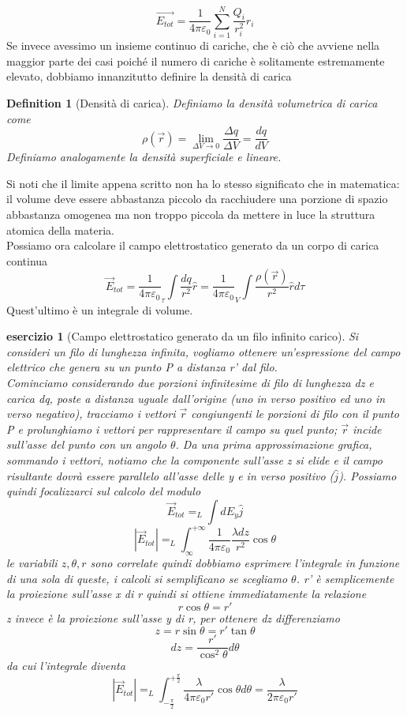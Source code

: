 \documentclass[10pt,a4paper]{article}
\newtheorem{esercizio}{esercizio}
\newtheorem{definition}{Definition}
\begin{document}
\[\vec{E_{tot}} = \frac{1}{4\pi\varepsilon_0}\sum_{i=1}^{N}\frac{Q_i}{ r_i^2} \hat{r}_i\]
Se invece avessimo un insieme continuo di cariche, che è ciò che avviene nella maggior parte dei casi poiché il numero di cariche è solitamente estremamente elevato, dobbiamo innanzitutto definire la densità di carica
\begin{definition}[Densità di carica]
Definiamo la densità volumetrica di carica come
\[\rho(\vec{r})=\lim_{\Delta V \to 0} \frac{\Delta q}{\Delta V} = \frac{dq}{dV}\]
Definiamo analogamente la densità superficiale e lineare. 
\end{definition}
Si noti che il limite appena scritto non ha lo stesso significato che in matematica: il volume deve essere abbastanza piccolo da racchiudere una porzione di spazio abbastanza omogenea ma non troppo piccola da mettere in luce la struttura atomica della materia.\\
Possiamo ora calcolare il campo elettrostatico generato da un corpo di carica continua 
\[\vec{E}_{tot} = \frac{1}{4\pi\varepsilon_0} _{\tau}\int\frac{dq}{r^2}\hat{r} = \frac{1}{4\pi\varepsilon_0} _V\int\frac{\rho(\vec{r})}{r^2}\hat{r}d\tau\]
Quest'ultimo è un integrale di volume.
\begin{esercizio}[Campo elettrostatico generato da un filo infinito carico]
Si consideri un filo di lunghezza infinita, vogliamo ottenere un'espressione del campo elettrico che genera su un punto P a distanza r' dal filo. \\
Cominciamo considerando due porzioni infinitesime di filo di lunghezza dz e carica dq, poste a distanza uguale dall'origine (uno in verso positivo ed uno in verso negativo), tracciamo i vettori $\vec{r}$ congiungenti le porzioni di filo con il punto P e prolunghiamo i vettori per rappresentare il campo su quel punto; $\vec{r}$ incide sull'asse del punto con un angolo $\theta$. Da una prima approssimazione grafica, sommando i vettori, notiamo che la componente sull'asse z si elide e il campo risultante dovrà essere parallelo all'asse delle y e in verso positivo ($\hat{j}$). Possiamo quindi focalizzarci sul calcolo del modulo
\[\vec{E}_{tot} = _L\int dE_y\hat{j}\]
\[|\vec{E}_{tot}| = _L\int^{+\infty}_{\infty} \frac{1}{4\pi\varepsilon_0}\frac{\lambda dz}{r^2}\cos\theta\]
le variabili \(z, \theta, r\) sono correlate quindi dobbiamo esprimere l'integrale in funzione di una sola di queste, i calcoli si semplificano se scegliamo $\theta$. r' è semplicemente la proiezione sull'asse x di r quindi si ottiene immediatamente la relazione
\[r \cos\theta = r'\]
z invece è la proiezione sull'asse y di r, per ottenere dz differenziamo
\[z = r \sin\theta = r' \tan\theta\]
\[dz = \frac{r'}{\cos^2\theta}d\theta\]
da cui l'integrale diventa
\[|\vec{E}_{tot}| = _L\int^{+\frac{\pi}{2}}_{-\frac{\pi}{2}} \frac{\lambda}{4\pi\varepsilon_0 r'}\cos\theta d\theta = \frac{\lambda}{2\pi\varepsilon_0 r'}\]
\end{esercizio}
\end{document}
